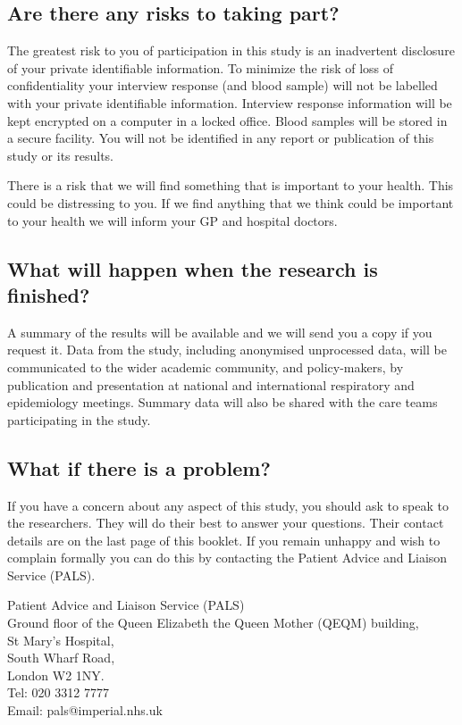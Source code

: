 \documentclass[a4paper,10pt]{article}
\begin{document}
\subsection*{Are there any risks to taking part?}

The greatest risk to you of participation in this study is an inadvertent disclosure of your private identifiable information. To minimize the risk of loss of confidentiality your interview response (and blood sample) will not be labelled with your private identifiable information. Interview response information will be kept encrypted on a computer in a locked office. Blood samples will be stored in a secure facility. You will not be identified in any report or publication of this study or its results.

There is a risk that we will find something that is important to your health. This could be distressing to you. If we find anything that we think could be important to your health we will inform your GP and hospital doctors. 

\subsection*{What will happen when the research is finished?}

A summary of the results will be available and we will send you a copy if you request it. Data from the study, including anonymised unprocessed data, will be communicated to the wider academic community, and policy-makers, by publication and presentation at national and international respiratory and epidemiology meetings. Summary data will also be shared with the care teams participating in the study. 

\subsection*{What if there is a problem?}

If you have a concern about any aspect of this study, you should ask to speak to the researchers. They will do their best to answer your questions. Their contact details are on the last page of this booklet. If you remain unhappy and wish to complain formally you can do this by contacting the Patient Advice and Liaison Service (PALS). \\

\newpage

\begin{flushleft}

Patient Advice and Liaison Service (PALS) \\    
Ground floor of the Queen Elizabeth the Queen Mother (QEQM) building, \\
St Mary’s Hospital, \\
South Wharf Road,\\
London W2 1NY.\\
Tel: 020 3312 7777\\
Email: pals@imperial.nhs.uk\\

\end{flushleft}
\end{document}
